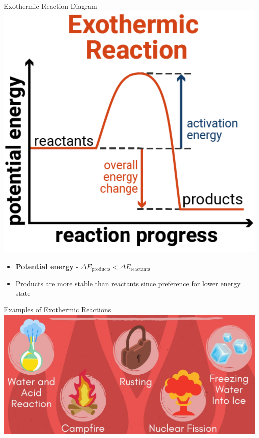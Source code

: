 \documentclass[11pt]{beamer}
\begin{document}
\begin{frame}{Exothermic Reaction Diagram}
  \centering
  \includegraphics[width=0.5\linewidth]{exo_rxn}
  \begin{itemize}
  \item \textbf{Potential energy} - $\Delta E_\text{products} < \Delta E_\text{reactants}$
  \item Products are more stable than reactants since preference
    for lower energy state
  \end{itemize}
\end{frame}

\begin{frame}{Examples of Exothermic Reactions}
  \centering
  \includegraphics[width=\linewidth]{exo_everyday}
\end{frame}
\end{document}
